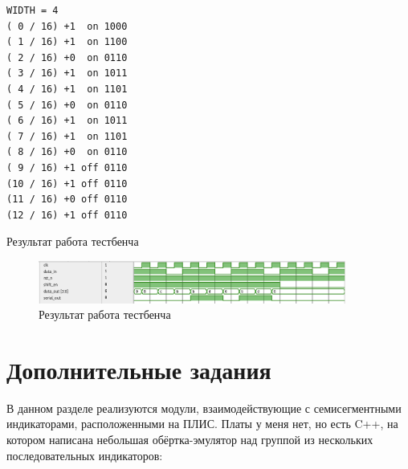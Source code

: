 \documentclass[a4paper]{article}
\begin{document}
  \begin{listing}[H]
    \begin{verbatim}
WIDTH = 4
( 0 / 16) +1  on 1000
( 1 / 16) +1  on 1100
( 2 / 16) +0  on 0110
( 3 / 16) +1  on 1011
( 4 / 16) +1  on 1101
( 5 / 16) +0  on 0110
( 6 / 16) +1  on 1011
( 7 / 16) +1  on 1101
( 8 / 16) +0  on 0110
( 9 / 16) +1 off 0110
(10 / 16) +1 off 0110
(11 / 16) +0 off 0110
(12 / 16) +1 off 0110
    \end{verbatim}
    \caption{Результат работа тестбенча}
  \end{listing}

  \begin{figure}[H]
    \centering
    \includegraphics[width=0.9\textwidth]{lab_322.png}
    \caption{Результат работа тестбенча}
  \end{figure}

  \newpage
  \section{Дополнительные задания}

  В данном разделе реализуются модули, взаимодействующие с семисегментными
  индикаторами, расположенными на ПЛИС. Платы у меня нет, но есть C++, на котором
  написана небольшая обёртка-эмулятор над группой из нескольких последовательных
  индикаторов:
\end{document}
